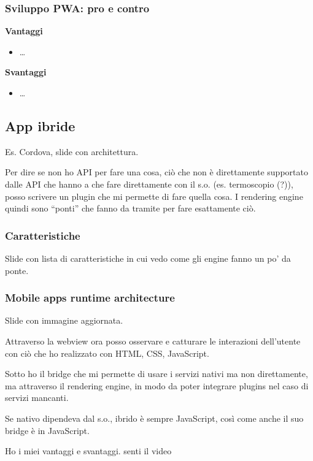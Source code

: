 \subsubsection{Sviluppo PWA: pro e contro}
\par \textbf{Vantaggi}
\begin{itemize}
    \item \dots
\end{itemize}

\par \textbf{Svantaggi}
\begin{itemize}
    \item \dots
\end{itemize}

\subsection{App ibride}
\par Es. Cordova, slide con architettura.
\par Per dire se non ho API per fare una cosa, ciò che non è direttamente supportato dalle API che hanno a che fare direttamente con il s.o. (es. termoscopio (?)), posso scrivere un plugin che mi permette di fare quella cosa. I rendering engine quindi sono ``ponti'' che fanno da tramite per fare esattamente ciò.

\subsubsection{Caratteristiche}
\par Slide con lista di caratteristiche in cui vedo come gli engine fanno un po' da ponte.

\subsubsection{Mobile apps runtime architecture}
\par Slide con immagine aggiornata. 
\par Attraverso la webview ora posso osservare e catturare le interazioni dell'utente con ciò che ho realizzato con HTML, CSS, JavaScript.
\par Sotto ho il bridge che mi permette di usare i servizi nativi ma non direttamente, ma attraverso il rendering engine, in modo da poter integrare plugins nel caso di servizi mancanti. 
\par Se nativo dipendeva dal s.o., ibrido è sempre JavaScript, così come anche il suo bridge è in JavaScript.
\par Ho i miei vantaggi e svantaggi. senti il video 

